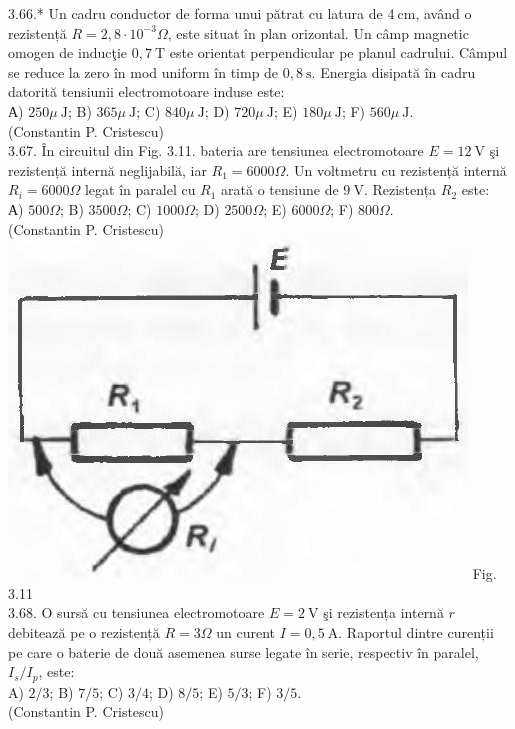 \documentclass[10pt]{article}
\begin{document}
3.66.* Un cadru conductor de forma unui pătrat cu latura de $4 \mathrm{~cm}$, având o rezistență $R=2,8 \cdot 10^{-3} \Omega$, este situat în plan orizontal. Un câmp magnetic omogen de inducţie $0,7 \mathrm{~T}$ este orientat perpendicular pe planul cadrului. Câmpul se reduce la zero în mod uniform în timp de $0,8 \mathrm{~s}$. Energia disipată în cadru datorită tensiunii electromotoare induse este:\\ А) $250 \mu \mathrm{~J}$; B) $365 \mu \mathrm{~J}$; C) $840 \mu \mathrm{~J}$; D) $720 \mu \mathrm{~J}$; E) $180 \mu \mathrm{~J}$; F) $560 \mu \mathrm{~J}$.\\ (Constantin P. Cristescu)\\

3.67. În circuitul din Fig. 3.11. bateria are tensiunea electromotoare $E=12 \mathrm{~V}$ şi rezistență internă neglijabilă, iar $R_{1}=6000 \Omega$. Un voltmetru cu rezistență internă $R_{i}=6000 \Omega$ legat în paralel cu $R_{1}$ arată o tensiune de $9 \mathrm{~V}$. Rezistența $R_{2}$ este:\\ А) $500 \Omega$; B) $3500 \Omega$; C) $1000 \Omega$; D) $2500 \Omega$; E) $6000 \Omega$; F) $800 \Omega$.\\ (Constantin P. Cristescu)\\ \includegraphics[max width=\textwidth, center]{2025_07_01_5b3ff9fa0d508c8e9f17g-158} Fig. 3.11\\

3.68. O sursă cu tensiunea electromotoare $E=2 \mathrm{~V}$ şi rezistența internă $r$ debitează pe o rezistență $R=3 \Omega$ un curent $I=0,5 \mathrm{~A}$. Raportul dintre curenții pe care o baterie de două asemenea surse legate în serie, respectiv în paralel, $I_{s} / I_{p}$, este:\\ A) $2 / 3$; B) $7 / 5$; C) $3 / 4$; D) $8 / 5$; E) $5 / 3$; F) $3 / 5$.\\ (Constantin P. Cristescu)\\
\end{document}
